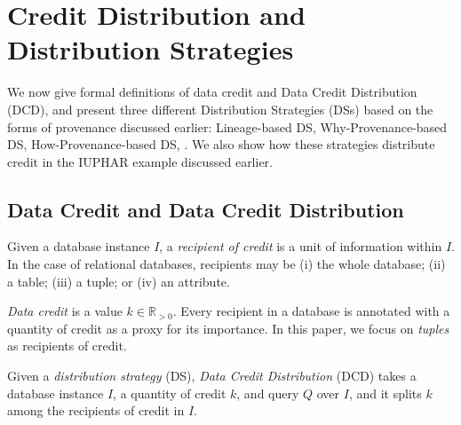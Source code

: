 \section{Credit Distribution and Distribution Strategies}
\label{section:distribution_strategies}
We now give formal definitions of data credit and Data Credit Distribution (DCD), and present three different Distribution Strategies (DSs) based on the forms of provenance discussed earlier:  Lineage-based DS, Why-Provenance-based DS, How-Provenance-based DS, .  We also show how these strategies distribute credit in the IUPHAR example discussed earlier.


\subsection{Data Credit and Data Credit Distribution}
Given a database instance $I$, a \emph{recipient of credit} is a unit of information within $I$. In the case of relational databases, recipients may be (i) the whole database; (ii) a table; (iii) a tuple; or (iv) an attribute.

\emph{Data credit} is a value $k \in \mathbb{R}_{>0}$. 
Every recipient in a database is annotated with a quantity of credit as a proxy for its importance. In this paper, we focus on {\em tuples} as recipients of credit. 


Given a \emph{distribution strategy} (DS),  \emph{Data Credit Distribution} (DCD) takes a database instance $I$, a quantity of credit $k$, %
and query $Q$ over $I$, and it splits $k$ among the recipients of credit in $I$.


